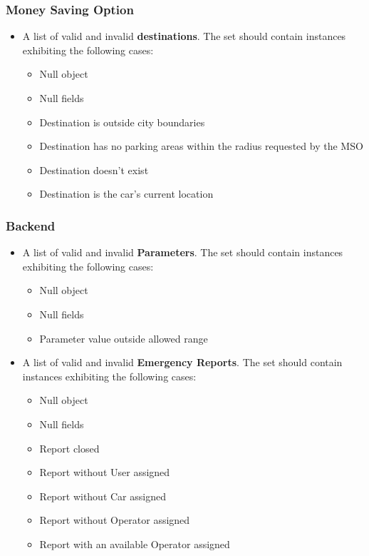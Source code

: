 		
		
		\subsubsection{Money Saving Option}
		
		\begin{itemize}
			\item A list of valid and invalid \textbf{destinations}. The set should contain instances exhibiting the following cases:
				\begin{itemize}
					\item Null object
					\item Null fields
					\item Destination is outside city boundaries
					\item Destination has no parking areas within the radius requested by the MSO
					\item Destination doesn't exist
					\item Destination is the car's current location
				\end{itemize}
		\end{itemize}
		
		
		
		\subsubsection{Backend}
		
		\begin{itemize}
			\item A list of valid and invalid \textbf{Parameters}. The set should contain instances exhibiting the following cases:
				\begin{itemize}
					\item Null object
					\item Null fields
					\item Parameter value outside allowed range
				\end{itemize}
		\end{itemize}
		
		\begin{itemize}
			\item A list of valid and invalid \textbf{Emergency Reports}. The set should contain instances exhibiting the following cases:
				\begin{itemize}
					\item Null object
					\item Null fields
					\item Report closed
					\item Report without User assigned
					\item Report without Car assigned
					\item Report without Operator assigned
					\item Report with an available Operator assigned
				\end{itemize}
		\end{itemize}
